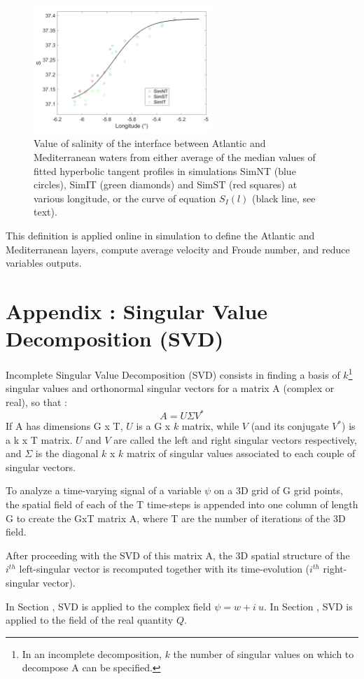 \begin{figure}[!h]
 \centering
 \includegraphics[width=0.6\textwidth]{./GBR3D/salinite_interface_papier.png}
 \caption [Value of salinity of the interface between Atlantic and Mediterranean waters]{Value of salinity of the interface between Atlantic and Mediterranean waters from either average of the median values of fitted hyperbolic tangent profiles in simulations SimNT (blue circles), SimIT (green diamonds) and SimST (red squares) at various longitude, or the curve of equation $S_I(l)$ (black line, see text).}
 \label{fig_defintf}
\end{figure}

This definition is applied online in simulation to define the Atlantic and Mediterranean layers, compute average velocity and Froude number, and reduce variables outputs.
\color{black}

\section{Appendix : Singular Value Decomposition (SVD)}
\label{annexeSVD}
Incomplete Singular Value Decomposition (SVD) consists in finding a basis of $k$\footnote{In an incomplete decomposition, $k$ the number of singular values on which to decompose A can be specified.} singular values and orthonormal singular vectors for a matrix A (complex or real), so that :
\begin{equation}
A = U \Sigma V^* 
\end{equation}
If A has dimensions G x T, $U$ is a G x $k$ matrix, while $V$ (and its conjugate $V^*$) is a k x T matrix. $U$ and $V$ are called the left and right singular vectors respectively, and $\Sigma$ is the diagonal $k$ x $k$ matrix of singular values associated to each couple of singular vectors.

To analyze a time-varying signal of a variable $\psi$ on a 3D grid of G grid points, the spatial field of each of the T time-steps is appended into one column of length G to create the GxT matrix A, where T are the number of iterations of the 3D field. 

After proceeding with the SVD of this matrix A, the 3D spatial structure of the $i^{th}$ left-singular vector is recomputed together with its time-evolution ($i^{th}$ right-singular vector).

In Section , SVD is applied to the complex field $\psi=w+i\ u$. %
In Section , SVD is applied to the field of the real quantity $Q$.
